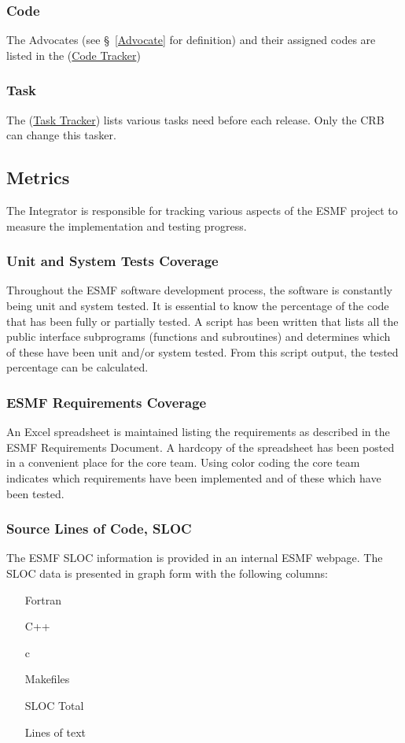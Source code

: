 {\subsubsection{Code}
The Advocates (see \S~\ref{Advocate} for definition) and their assigned codes are listed
in the (\href{http://sourceforge.net/tracker/?group_id=38089\&atid=421189}{Code Tracker})

\subsubsection{Task}
The (\href{http://sourceforge.net/tracker/?group_id=38089}{Task Tracker}) lists various tasks need before each release. Only the CRB can change this tasker. 


\subsection{Metrics}

The Integrator is responsible for tracking various aspects of the
ESMF project to measure the implementation and testing progress.
\subsubsection{Unit and System Tests Coverage}
Throughout the ESMF software development process, the software is constantly
being unit and system tested. It is essential to know the percentage of the
code that has been fully or partially tested. A script has been written that 
lists all the public interface subprograms (functions and subroutines) and 
determines which of these have been unit and/or system tested. From this script
output, the tested percentage can be calculated.
\subsubsection{ESMF Requirements Coverage}
An Excel spreadsheet is maintained listing the requirements as described in the
ESMF Requirements Document. A hardcopy of the spreadsheet has been posted in a
convenient place for the core team. Using color coding the core team indicates
which requirements have been implemented and of these which have been tested.
\subsubsection{Source Lines of Code, SLOC}
The ESMF SLOC information is provided in an internal ESMF webpage. The
SLOC data is presented in graph form with the following columns:
\begin{enumerate}
\item[Fortran] 
\item[C++] 
\item[c] 
\item[Makefiles] 
\item[SLOC Total] 
\item[Lines of text] 
\end{enumerate}

}
